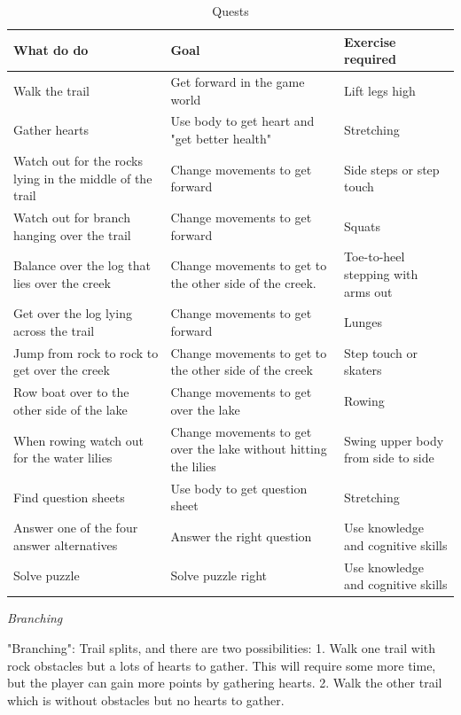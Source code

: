 \begin{table}
     \begin{tabular}{|>{\raggedright}p{}|>{\raggedright}p{5cm}|p{}|}
       \hline
        \textbf{What do do} & \textbf{Goal} & \textbf{Exercise required}  \\ \hline
       Walk the trail & Get forward in the game world & Lift legs high  \\ \hline
       Gather hearts & Use body to get heart and "get better health" &  Stretching \\ \hline
	   Watch out for the rocks lying in the middle of the trail & Change movements to get forward & Side steps or step touch  \\ \hline
	     Watch out for branch hanging over the trail & Change movements to get forward & Squats
	      \\ \hline
	       Balance over the log that lies over the creek & Change movements to get to the other side of the creek. & Toe-to-heel stepping with arms out \\ \hline
	       Get over the log lying across the trail & Change movements to get forward & Lunges \\ \hline
	       Jump from rock to rock to get over the creek & Change movements to get to the other side of the creek & Step touch or skaters \\ \hline
	       Row boat over to the other side of the lake & Change movements to get over the lake  & Rowing \\ \hline
	       When rowing watch out for the water lilies & Change movements to get over the lake without hitting the lilies  & Swing upper body from side to side \\ \hline
	       Find question sheets & Use body to get question sheet  & Stretching \\ \hline
	       Answer one of the four answer alternatives & Answer the right question  & Use knowledge and cognitive skills \\ \hline
	       Solve puzzle & Solve puzzle right  & Use knowledge and cognitive skills \\ \hline
      \end{tabular}
      \caption[Quests in the "Nature trail" game]{Quests}
    \label{tab:quests1}
 \end{table}
 
\emph{Branching}
 
"Branching": Trail splits, and there are two possibilities: 1. Walk one trail with rock obstacles but a lots of hearts to gather. This will require some more time, but the player can gain more points by gathering hearts. 2. Walk the other trail which is without obstacles but no hearts to gather. 

